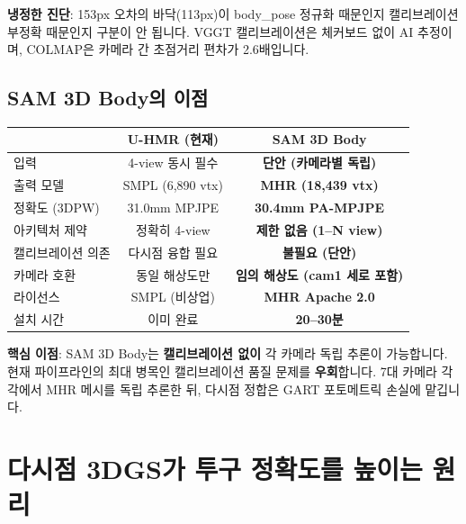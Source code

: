 \documentclass[11pt, a4paper]{report}
\begin{document}
\begin{warningbox}
\textbf{냉정한 진단}: 153px 오차의 바닥(113px)이 body\_pose 정규화 때문인지 캘리브레이션 부정확 때문인지 구분이 안 됩니다. VGGT 캘리브레이션은 체커보드 없이 AI 추정이며, COLMAP은 카메라 간 초점거리 편차가 2.6배입니다.
\end{warningbox}

\section{SAM 3D Body의 이점}

\begin{center}
\renewcommand{\arraystretch}{1.3}
\begin{tabular}{lcc}
\toprule
& \textbf{U-HMR (현재)} & \textbf{SAM 3D Body} \\
\midrule
입력 & 4-view 동시 필수 & \textbf{단안 (카메라별 독립)} \\
출력 모델 & SMPL (6,890 vtx) & \textbf{MHR (18,439 vtx)} \\
정확도 (3DPW) & 31.0mm MPJPE & \textbf{30.4mm PA-MPJPE} \\
아키텍처 제약 & 정확히 4-view & \textbf{제한 없음 (1--N view)} \\
캘리브레이션 의존 & 다시점 융합 필요 & \textbf{불필요 (단안)} \\
카메라 호환 & 동일 해상도만 & \textbf{임의 해상도 (cam1 세로 포함)} \\
라이선스 & SMPL (비상업) & \textbf{MHR Apache 2.0} \\
설치 시간 & 이미 완료 & \textbf{20--30분} \\
\bottomrule
\end{tabular}
\end{center}

\begin{keyidea}
\textbf{핵심 이점}: SAM 3D Body는 \textbf{캘리브레이션 없이} 각 카메라 독립 추론이 가능합니다. 현재 파이프라인의 최대 병목인 캘리브레이션 품질 문제를 \textbf{우회}합니다. 7대 카메라 각각에서 MHR 메시를 독립 추론한 뒤, 다시점 정합은 GART 포토메트릭 손실에 맡깁니다.
\end{keyidea}


\chapter{다시점 3DGS가 투구 정확도를 높이는 원리}
\end{document}
